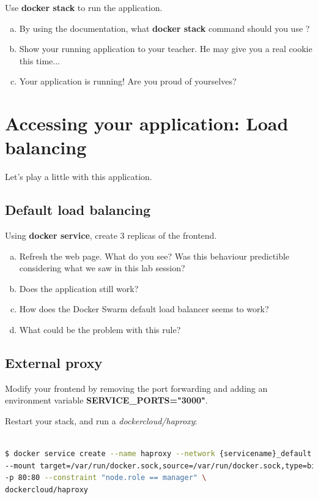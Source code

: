 \documentclass[a4paper,11pt]{exam}
\begin{document}
Use \textbf{docker stack} to run the application.

\begin{questions}
	\question 
	\begin{enumerate}[(a)]
		\item By using the documentation, what \textbf{docker stack} command should you use ?
		\item Show your running application to your teacher. He may give you a real cookie this time...
		\item Your application is running! Are you proud of yourselves?
	\end{enumerate}
\end{questions}

\section{Accessing your application: Load balancing}

Let's play a little with this application. 
\subsection{Default load balancing}
\begin{questions}
	\question Using \textbf{docker service}, create 3 replicas of the frontend.
	\begin{enumerate}[(a)]
		\item Refresh the web page. What do you see? Was this behaviour predictible considering what we saw in this lab session?
		\item Does the application still work?
		\item How does the Docker Swarm default load balancer seems to work?
		\item What could be the problem with this rule?
	\end{enumerate}
\end{questions}

\subsection{External proxy}

Modify your frontend by removing the port forwarding and adding an environment variable \textbf{SERVICE\_PORTS="3000"}.

Restart your stack, and run a \textit{dockercloud/haproxy}:
\begin{lstlisting}[frame=single,language={sh}]  % Start your code-block

$ docker service create --name haproxy --network {servicename}_default \
--mount target=/var/run/docker.sock,source=/var/run/docker.sock,type=bind \
-p 80:80 --constraint "node.role == manager" \
dockercloud/haproxy

\end{lstlisting}
\end{document}
